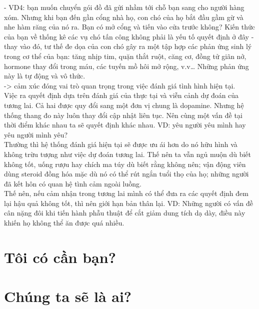 \documentclass{article}
\newcommand\tab[1][1cm]{\hspace*{#1}}
\begin{document}
\tab - VD4:  bạn muốn chuyển gói đồ đã gửi nhầm tới chỗ
bạn sang cho người hàng xóm. Nhưng khi bạn đến gần cổng nhà họ, con
chó của họ bắt đầu gầm gừ và nhe hàm răng của nó ra. Bạn có mở cổng và
tiến vào cửa trước không? Kiến thức của bạn về thống kê các vụ chó tấn
công không phải là yếu tố quyết định ở đây - thay vào đó, tư thế đe dọa của
con chó gây ra một tập hợp các phản ứng sinh lý trong cơ thể của bạn: tăng
nhịp tim, quặn thắt ruột, căng cơ, đồng tử giãn nở, hormone thay đổi trong
máu, các tuyến mồ hôi mở rộng, v.v… Những phản ứng này là tự động và
vô thức.\\
\tab -> cảm xúc đóng vai trò quan trọng trong việc đánh giá tình hình hiện tại.\\
\tab Việc ra quyết định dựa trên đánh giá của thực tại và viễn cảnh dự đoán của tương lai. Cả hai được quy đổi
sang một đơn vị chung là dopamine. Nhưng hệ thống thang đo này luôn thay đổi cập nhật liên tục. Nên cùng một vấn
đề tại thời điểm khác nhau ta sẽ quyết định khác nhau. VD: yêu người yêu mình hay yêu người mình yêu?\\
\tab Thường thì hệ thống đánh giá hiện tại sẽ được ưu ái hơn do nó hữu hình và không trừu tượng như việc dự đoán
tương lai. Thế nên ta vẫn ngủ muộn dù biết không tốt, uống rượu hay chích ma túy dù biết rằng không
nên; vận động viên dùng steroid đồng hóa mặc dù nó có thể rút ngắn tuổi
thọ của họ; những người đã kết hôn có quan hệ tình cảm ngoài luồng.\\
\tab Thế nên, nếu cảm nhận trong tương lai mình có thể đưa ra các quyết định đem lại hậu quả không tốt, thì nên giới
hạn bản thân lại. VD: Những người có vấn đề cân nặng đôi khi tiến hành phẫu thuật để cắt giảm dung
tích dạ dày, điều này khiến họ không thể ăn được quá nhiều.\\
\section{Tôi có cần bạn?}
\section{Chúng ta sẽ là ai?}
\end{document}
